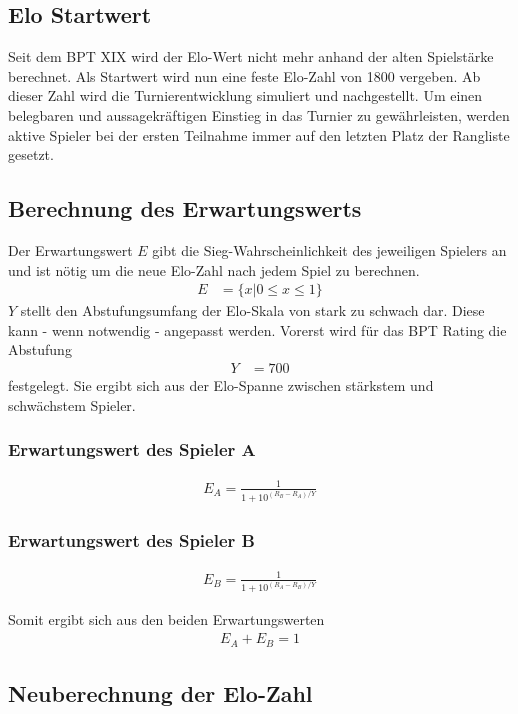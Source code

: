 \documentclass[a5paper, 12pt]{article}
\begin{document}
\subsection{Elo Startwert}
Seit dem BPT XIX wird der Elo-Wert nicht mehr anhand der alten Spielstärke berechnet. Als Startwert wird nun eine feste Elo-Zahl von 1800 vergeben. Ab dieser Zahl wird die Turnierentwicklung simuliert und nachgestellt.
Um einen belegbaren und aussagekräftigen Einstieg in das Turnier zu gewährleisten, werden aktive Spieler bei der ersten Teilnahme immer auf den letzten Platz der Rangliste gesetzt.
\subsection{Berechnung des Erwartungswerts}
Der Erwartungswert \(E\) gibt die Sieg-Wahrscheinlichkeit des jeweiligen Spielers an und ist nötig um die neue Elo-Zahl nach jedem Spiel zu berechnen.
\begin{align}
E&=\{x|0 \leq x \leq 1\}
\end{align}
\(Y\) stellt den Abstufungsumfang der Elo-Skala von stark zu schwach dar. Diese kann - wenn notwendig - angepasst werden. Vorerst wird für das BPT Rating die Abstufung
\begin{align}
Y&=700
\end{align}
festgelegt. Sie ergibt sich aus der Elo-Spanne zwischen stärkstem und schwächstem Spieler.

\subsubsection{Erwartungswert des Spieler A}
\begin{align}
E_{A} = \frac{1}{1+10^{(R_{B}-R_{A})/Y}}
\end{align}

\subsubsection{Erwartungswert des Spieler B}
\begin{align}
E_{B} = \frac{1}{1+10^{(R_{A}-R_{B})/Y}}
\end{align}

Somit ergibt sich aus den beiden Erwartungswerten
\begin{align}
E_A + E_B = 1
\end{align}

\subsection{Neuberechnung der Elo-Zahl}
\end{document}
